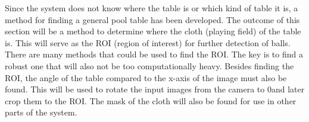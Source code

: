 Since the system does not know where the table is or which kind of table it is, a method for finding a general pool table has been developed. The outcome of this section will be a method to determine where the cloth (playing field) of the table is. This will serve as the ROI (region of interest) for further detection of balls. There are many methods that could be used to find the ROI. The key is to find a robust one that will also not be too computationally heavy. Besides finding the ROI, the angle of the table compared to the x-axis of the image must also be found. This will be used to rotate the input images from the camera to 0\degree and later crop them to the ROI. The mask of the cloth will also be found for use in other parts of the system.\\
